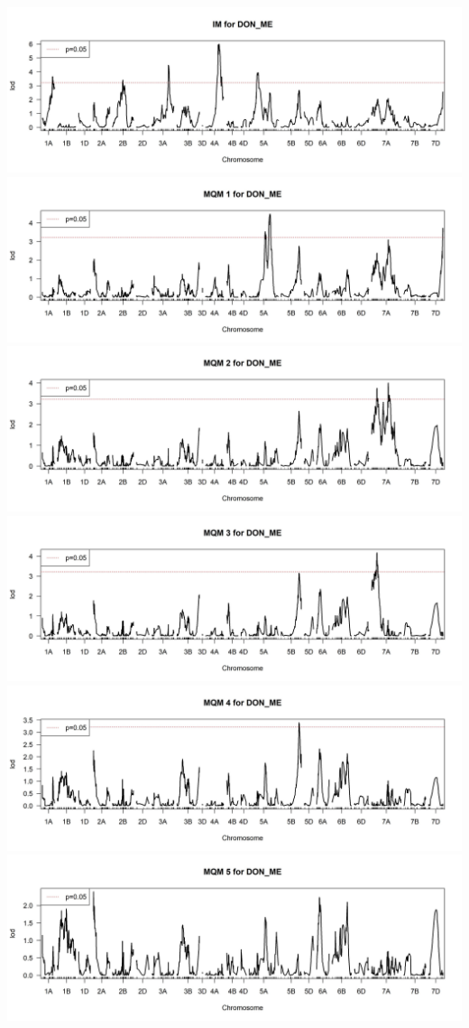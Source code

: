 \documentclass[
]{article}
\begin{document}
\includegraphics{Scan_IM_DON_ME.jpg}
\includegraphics{Scan_MQM1_DON_ME.jpg}
\includegraphics{Scan_MQM2_DON_ME.jpg}
\includegraphics{Scan_MQM3_DON_ME.jpg}
\includegraphics{Scan_MQM4_DON_ME.jpg}
\includegraphics{Scan_MQM5_DON_ME.jpg} \pagebreak
\end{document}
